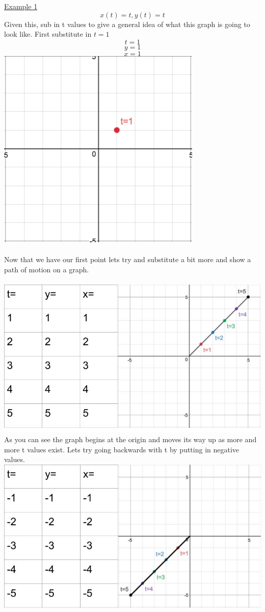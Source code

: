 \documentclass[a4paper,openright, 14pt]{article}
\begin{document}
\\\\
\underline{Example 1}\\
$$x(t)=t,y(t)=t$$
Given this, sub in t values to give a general idea of what this graph is going to look like. First substitute in $t=1$
$$t=1$$
$$y=1$$
$$x=1$$
\includegraphics[width = 5 cm, height = 5 cm]{JOSHUA2.png}\\
\\Now that we have our first point lets try and substitute a bit more and show a path of motion on a graph.\\\\
\includegraphics[width = 15 cm, height = 7 cm]{JOSHUA1.jpg}\\
As you can see the graph begins at the origin and moves its way up as more and more t values exist. Lets try going backwards with t by putting in negative values. \\
\includegraphics[width = 15 cm, height = 7 cm]{JOSHUA3.jpg}\\
\end{document}

